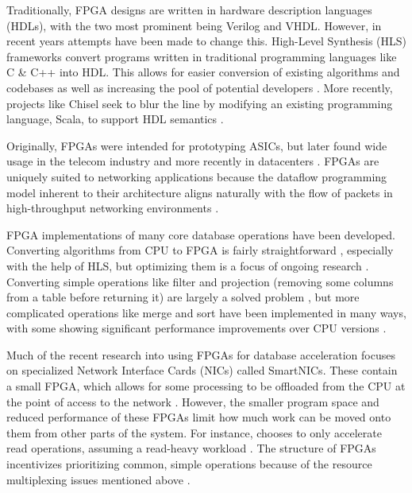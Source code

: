 Traditionally, FPGA designs are written in hardware description languages
(HDLs), with the two most prominent being Verilog and VHDL. However, in recent
years attempts have been made to change this. High-Level Synthesis (HLS)
frameworks convert programs written in traditional programming languages like C
\& C++ into HDL. This allows for easier conversion of existing algorithms and
codebases as well as increasing the pool of potential developers
\autocite{martin-destest-2009}. More recently, projects like Chisel seek to blur
the line by modifying an existing programming language, Scala, to support HDL
semantics \autocite{chisel}.

Originally, FPGAs were intended for prototyping ASICs, but later found wide
usage in the telecom industry \autocite{bobda-trets-2022,mencer-queue-2020} and
more recently in datacenters \autocite{mencer-queue-2020,hoozemans-cas-2021}.
FPGAs are uniquely suited to networking applications because the dataflow
programming model \autocite{hoozemans-cas-2021} inherent to their architecture
aligns naturally with the flow of packets in high-throughput networking
environments \autocite{mueller-sigmod-2009}.


\label{sec:datacenter-fpga}

FPGA implementations of many core database operations have been developed.
Converting algorithms from CPU to FPGA is fairly straightforward
\autocite{fang-vldb-2020}, especially with the help of HLS, but optimizing them
is a focus of ongoing research \autocite{fang-vldb-2020}. Converting simple
operations like filter and projection (removing some columns from a table before
returning it) are largely a solved problem \autocite{fang-vldb-2020}, but more
complicated operations like merge and sort have been implemented in many ways,
with some showing significant performance improvements over CPU versions
\autocite{leggett-trets-2025,moghaddamfar-damon-2021}.

Much of the recent research into using FPGAs for database acceleration focuses
on specialized Network Interface Cards (NICs) called SmartNICs. These contain a
small FPGA, which allows for some processing to be offloaded from the CPU at the
point of access to the network \autocite{strom,honeycomb}. However, the smaller program space and reduced
performance of these FPGAs limit how much work can be moved onto them from other
parts of the system. For instance,  chooses to only
accelerate read operations, assuming a read-heavy workload \autocite{honeycomb}.
The structure of FPGAs incentivizes prioritizing common, simple operations
because of the resource multiplexing issues mentioned above
\autocite{honeycomb,moghaddamfar-damon-2021}.
